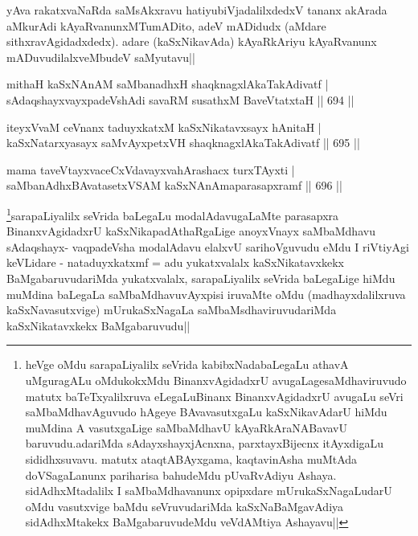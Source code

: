 \begin{artha}
yAva rakatxvaNaRda saMsAkxravu hatiyubiVjadalilxdedxV tananx akArada aMkurAdi kAyaRvanunxMTumADito, adeV mADidudx (aMdare sithxravAgidadxdedx). adare (kaSxNikavAda) kAyaRkAriyu kAyaRvanunx mADuvudilalxveMbudeV saMyutavu||
\end{artha}


\begin{shl}
mithaH kaSxNAnAM saMbanadhxH shaqknagxlAkaTakAdivatf | \\
sAdaqshayxvayxpadeVshAdi savaRM susathxM BaveVtatxtaH \hfill||  694 ||  
\end{shl}
				
\begin{shl}
iteyxVvaM ceVnanx taduyxkatxM kaSxNikatavxsayx hAnitaH | \\
kaSxNatarxyasayx saMvAyxpetxVH shaqknagxlAkaTakAdivatf \hfill||  695 ||  
\end{shl}
				
\begin{shl}
mama taveVtayxvaceCxVdavayxvahArashacx turxTAyxti | \\
saMbanAdhxBAvatasetxVSAM kaSxNAnAmaparasapxramf \hfill||  696 ||  
\end{shl}

\begin{artha}
\footnote{heVge oMdu sarapaLiyalilx seVrida kabibxNadabaLegaLu athavA uMguragALu  oMdukokxMdu BinanxvAgidadxrU avugaLagesaMdhaviruvudo matutx baTeTxyalilxruva eLegaLuBinanx BinanxvAgidadxrU avugaLu seVri saMbaMdhavAguvudo hAgeye BAvavasutxgaLu kaSxNikavAdarU hiMdu muMdina A vasutxgaLige saMbaMdhavU kAyaRkAraNABavavU baruvudu.adariMda sAdayxshayxjAcnxna, parxtayxBijecnx itAyxdigaLu sididhxsuvavu. matutx ataqtABAyxgama, kaqtavinAsha muMtAda doVSagaLanunx pariharisa bahudeMdu pUvaRvAdiyu Ashaya. sidAdhxMtadalilx I saMbaMdhavanunx opipxdare mUrukaSxNagaLudarU oMdu vasutxvige  baMdu seVruvudariMda kaSxNaBaMgavAdiya sidAdhxMtakekx BaMgabaruvudeMdu veVdAMtiya Ashayavu||}sarapaLiyalilx seVrida baLegaLu modalAdavugaLaMte parasapxra BinanxvAgidadxrU kaSxNikapadAthaRgaLige anoyxVnayx saMbaMdhavu sAdaqshayx- vaqpadeVsha modalAdavu elalxvU sarihoVguvudu eMdu I riVtiyAgi keVLidare - nataduyxkatxmf = adu yukatxvalalx kaSxNikatavxkekx BaMgabaruvudariMda yukatxvalalx, sarapaLiyalilx seVrida baLegaLige hiMdu muMdina baLegaLa saMbaMdhavuvAyxpisi iruvaMte oMdu (madhayxdalilxruva kaSxNavasutxvige) mUrukaSxNagaLa saMbaMsdhaviruvudariMda kaSxNikatavxkekx BaMgabaruvudu||
\end{artha}

